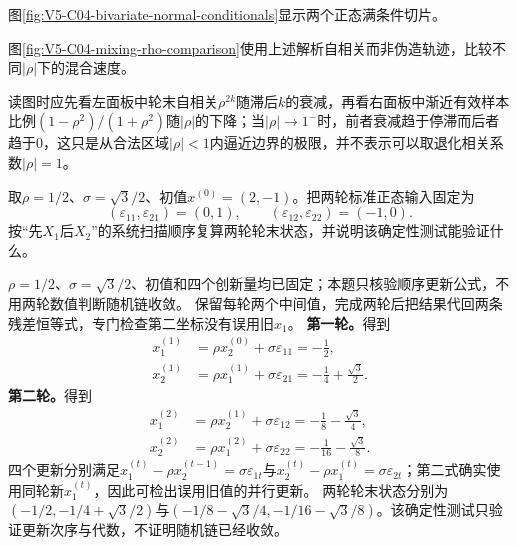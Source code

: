 图\ref{fig:V5-C04-bivariate-normal-conditionals}显示两个正态满条件切片。

图\ref{fig:V5-C04-mixing-rho-comparison}使用上述解析自相关而非伪造轨迹，比较不同$|\rho|$下的混合速度。

\FloatBarrier
读图时应先看左面板中轮末自相关$\rho^{2k}$随滞后$k$的衰减，再看右面板中渐近有效样本比例$(1-\rho^2)/(1+\rho^2)$随$|\rho|$的下降；当$|\rho|\to1^-$时，前者衰减趋于停滞而后者趋于$0$，这只是从合法区域$|\rho|<1$内逼近边界的极限，并不表示可以取退化相关系数$|\rho|=1$。

\begin{example}[两轮确定性更新测试]\label{exm:V5-C04-two-sweeps}
取$\rho=1/2$、$\sigma=\sqrt3/2$、初值$x^{(0)}=(2,-1)$。把两轮标准正态输入固定为
\[
(\varepsilon_{11},\varepsilon_{21})=(0,1),
\qquad
(\varepsilon_{12},\varepsilon_{22})=(-1,0).
\]
按“先$X_1$后$X_2$”的系统扫描顺序复算两轮轮末状态，并说明该确定性测试能验证什么。
\end{example}

\begin{solution}
\SolGiven $\rho=1/2$、$\sigma=\sqrt3/2$、初值和四个创新量均已固定；本题只核验顺序更新公式，不用两轮数值判断随机链收敛。
\SolPlan 保留每轮两个中间值，完成两轮后把结果代回两条残差恒等式，专门检查第二坐标没有误用旧$x_1$。
\SolDerive
\textbf{第一轮。}得到
\[
\begin{aligned}
x_1^{(1)}&=\rho x_2^{(0)}+\sigma\varepsilon_{11}
=-\frac12,\\
x_2^{(1)}&=\rho x_1^{(1)}+\sigma\varepsilon_{21}
=-\frac14+\frac{\sqrt3}{2}.
\end{aligned}
\]
\textbf{第二轮。}得到
\[
\begin{aligned}
x_1^{(2)}&=\rho x_2^{(1)}+\sigma\varepsilon_{12}
=-\frac18-\frac{\sqrt3}{4},\\
x_2^{(2)}&=\rho x_1^{(2)}+\sigma\varepsilon_{22}
=-\frac1{16}-\frac{\sqrt3}{8}.
\end{aligned}
\]
\SolCheck 四个更新分别满足$x_1^{(t)}-\rho x_2^{(t-1)}=\sigma\varepsilon_{1t}$与$x_2^{(t)}-\rho x_1^{(t)}=\sigma\varepsilon_{2t}$；第二式确实使用同轮新$x_1^{(t)}$，因此可检出误用旧值的并行更新。
\SolAnswer 两轮轮末状态分别为$(-1/2,-1/4+\sqrt3/2)$与$(-1/8-\sqrt3/4,-1/16-\sqrt3/8)$。该确定性测试只验证更新次序与代数，不证明随机链已经收敛。
\end{solution}

